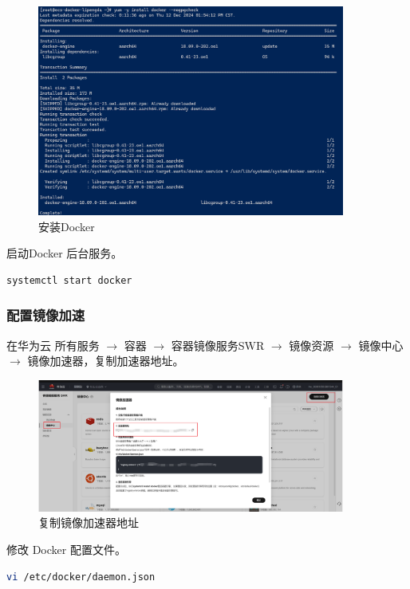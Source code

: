 \documentclass{article}
\begin{document}
\begin{figure}[H]
\centering
\includegraphics[width=0.9\textwidth]{img/1.5.1.png}
\caption{安装Docker}
\end{figure}

启动Docker 后台服务。

\begin{lstlisting}[language=bash]
    systemctl start docker
\end{lstlisting}

\subsubsection{配置镜像加速}

在华为云 所有服务 \(\to\) 容器 \(\to\) 容器镜像服务SWR \(\to\) 镜像资源 \(\to\) 镜像中心 \(\to\) 镜像加速器，复制加速器地址。

\begin{figure}[H]
\centering
\includegraphics[width=0.9\textwidth]{img/1.6.1.png}
\caption{复制镜像加速器地址}
\end{figure}

修改 Docker 配置文件。

\begin{lstlisting}[language=bash]
    vi /etc/docker/daemon.json
\end{lstlisting}
\end{document}
